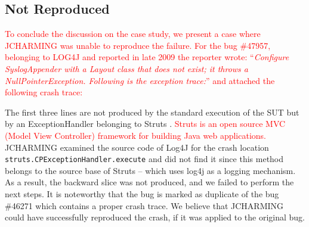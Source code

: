 \documentclass[times, doublespace]{smrauth}
\newcommand{\red}[1]{\textcolor{red}{#1}}
\begin{document}
\subsection{Not Reproduced}

\red{To conclude the discussion on the case study, we present a
case where JCHARMING was unable to reproduce the failure.
For the bug \#47957, belonging to LOG4J and reported in late
2009 the reporter wrote: ``{\it Configure SyslogAppender with a Layout class that does not
exist; it throws a NullPointerException. Following is the
exception trace:}'' and attached the following crash trace:}

\vspace*{0.3cm}

\noindent{}

\vspace*{0.3cm}


The first three lines are not produced by the standard
execution of the SUT but by an ExceptionHandler belonging
to Struts \cite{ApacheSoftwareFoundation2000}. \red{Struts is an open source MVC (Model View
Controller) framework for building Java web applications.}
JCHARMING examined the source code of Log4J for the
crash location {\tt struts.CPExceptionHandler.execute} and did not
find it since this method belongs to the source base of Struts
-- which uses log4j as a logging mechanism. As a result, the
backward slice was not produced, and we failed to perform the
next steps. It is noteworthy that the bug is marked as duplicate
of the bug \#46271 which contains a proper crash trace. We
believe that JCHARMING could have successfully
reproduced the crash, if it was applied to the original bug. \\
\end{document}
